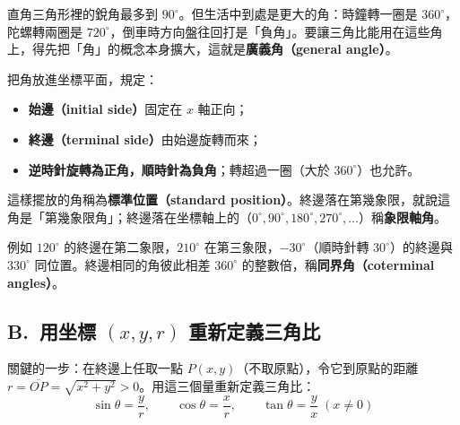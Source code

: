 \documentclass[11pt]{article}
\begin{document}
直角三角形裡的銳角最多到 $90^\circ$。但生活中到處是更大的角：時鐘轉一圈是 $360^\circ$，陀螺轉兩圈是 $720^\circ$，倒車時方向盤往回打是「負角」。要讓三角比能用在這些角上，得先把「角」的概念本身擴大，這就是\textbf{廣義角（general angle）}。

把角放進坐標平面，規定：
\begin{itemize}\setlength{\itemsep}{1pt}
\item \textbf{始邊（initial side）}固定在 $x$ 軸正向；
\item \textbf{終邊（terminal side）}由始邊旋轉而來；
\item \textbf{逆時針旋轉為正角，順時針為負角}；轉超過一圈（大於 $360^\circ$）也允許。
\end{itemize}
這樣擺放的角稱為\textbf{標準位置（standard position）}。終邊落在第幾象限，就說這角是「第幾象限角」；終邊落在坐標軸上的（$0^\circ,90^\circ,180^\circ,270^\circ,\dots$）稱\textbf{象限軸角}。

例如 $120^\circ$ 的終邊在第二象限，$210^\circ$ 在第三象限，$-30^\circ$（順時針轉 $30^\circ$）的終邊與 $330^\circ$ 同位置。終邊相同的角彼此相差 $360^\circ$ 的整數倍，稱\textbf{同界角（coterminal angles）}。

\subsection*{\sffamily B.\ 用坐標 $(x,y,r)$ 重新定義三角比}

關鍵的一步：在終邊上任取一點 $P(x,y)$（不取原點），令它到原點的距離 $r=\overline{OP}=\sqrt{x^2+y^2}>0$。用這三個量重新定義三角比：
$$\boxed{\;\sin\theta=\frac{y}{r},\qquad \cos\theta=\frac{x}{r},\qquad \tan\theta=\frac{y}{x}\;(x\ne0)\;}$$

\end{document}
